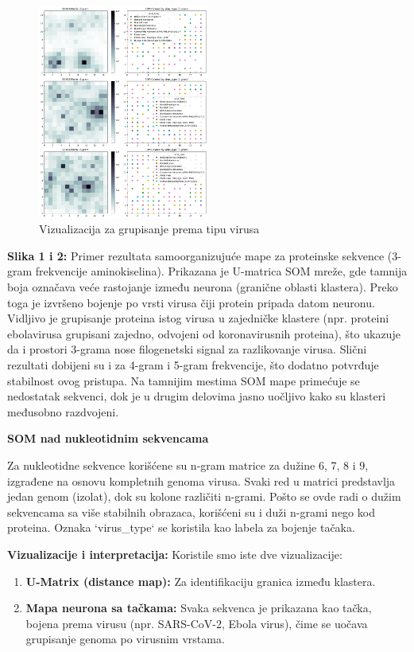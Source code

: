 \documentclass[a4paper,12pt]{article}
\begin{document}
\begin{figure}[h!]
    \centering
    \includegraphics[width=0.5\textwidth]{images/som-amino-acid-virus.png}
    \caption{Vizualizacija za grupisanje prema tipu virusa}
    \label{fig:som-struktura}
\end{figure}

\textbf{Slika 1 i 2:} Primer rezultata samoorganizujuće mape za proteinske sekvence (3-gram frekvencije
aminokiselina). Prikazana je U-matrica SOM mreže, gde tamnija boja označava veće rastojanje između
neurona (granične oblasti klastera). Preko toga je izvršeno bojenje po vrsti virusa čiji protein pripada
datom neuronu. Vidljivo je grupisanje proteina istog virusa u zajedničke klastere (npr. proteini ebolavirusa
grupisani zajedno, odvojeni od koronavirusnih proteina), što ukazuje da i prostori 3-grama nose filogenetski
signal za razlikovanje virusa. Slični rezultati dobijeni su i za 4-gram i 5-gram frekvencije, što dodatno potvrđuje stabilnost ovog pristupa. Na tamnijim mestima SOM mape primećuje se nedostatak sekvenci, dok je u drugim delovima jasno uočljivo kako su klasteri međusobno razdvojeni.

\vspace{20pt}
\textbf{SOM nad nukleotidnim sekvencama}
\vspace{10pt}

Za nukleotidne sekvence korišćene su n-gram matrice za dužine 6, 7, 8 i 9, izgrađene na osnovu kompletnih genoma virusa. Svaki red u matrici predstavlja jedan genom (izolat), dok su kolone različiti n-grami. Pošto se ovde radi o dužim sekvencama sa više stabilnih obrazaca, korišćeni su i duži n-grami nego kod proteina. Oznaka `virus\_type` se koristila kao labela za bojenje tačaka.

\vspace{10pt}
\textbf{Vizualizacije i interpretacija:}
Koristile smo iste dve vizualizacije:
\begin{enumerate}
  \item \textbf{U-Matrix (distance map):} Za identifikaciju granica između klastera.
  \item \textbf{Mapa neurona sa tačkama:} Svaka sekvenca je prikazana kao tačka, bojena prema virusu (npr. SARS-CoV-2, Ebola virus), čime se uočava grupisanje genoma po virusnim vrstama.
\end{enumerate}
\end{document}
